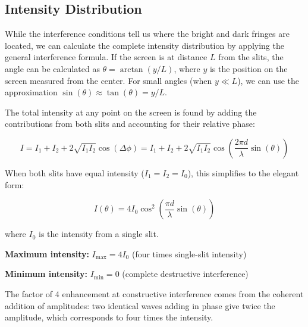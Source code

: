 \documentclass[
  a4paper,
]{book}
\begin{document}
\subsection{Intensity Distribution}\label{intensity-distribution}

While the interference conditions tell us where the bright and dark
fringes are located, we can calculate the complete intensity
distribution by applying the general interference formula. If the screen
is at distance \(L\) from the slits, the angle can be calculated as
\(\theta = \arctan(y/L)\), where \(y\) is the position on the screen
measured from the center. For small angles (when \(y \ll L\)), we can
use the approximation \(\sin(\theta) \approx \tan(\theta) = y/L\).

The total intensity at any point on the screen is found by adding the
contributions from both slits and accounting for their relative phase:

\[
I = I_1 + I_2 + 2\sqrt{I_1 I_2}\cos(\Delta\phi) = I_1 + I_2 + 2\sqrt{I_1 I_2}\cos\left(\frac{2\pi d}{\lambda}\sin(\theta)\right)
\]

When both slits have equal intensity (\(I_1 = I_2 = I_0\)), this
simplifies to the elegant form:

\begin{tcolorbox}[enhanced jigsaw, breakable, toptitle=1mm, bottomrule=.15mm, colbacktitle=quarto-callout-tip-color!10!white, title=\textcolor{quarto-callout-tip-color}{\faLightbulb}\hspace{0.5em}{Double Slit Intensity Formula}, arc=.35mm, rightrule=.15mm, bottomtitle=1mm, opacityback=0, toprule=.15mm, coltitle=black, leftrule=.75mm, opacitybacktitle=0.6, colback=white, left=2mm, titlerule=0mm, colframe=quarto-callout-tip-color-frame]

\[I(\theta) = 4I_0\cos^2\left(\frac{\pi d}{\lambda}\sin(\theta)\right)\]

where \(I_0\) is the intensity from a single slit.

\textbf{Maximum intensity:} \(I_{\text{max}} = 4I_0\) (four times
single-slit intensity)

\textbf{Minimum intensity:} \(I_{\text{min}} = 0\) (complete destructive
interference)

The factor of 4 enhancement at constructive interference comes from the
coherent addition of amplitudes: two identical waves adding in phase
give twice the amplitude, which corresponds to four times the intensity.

\end{tcolorbox}
\end{document}

